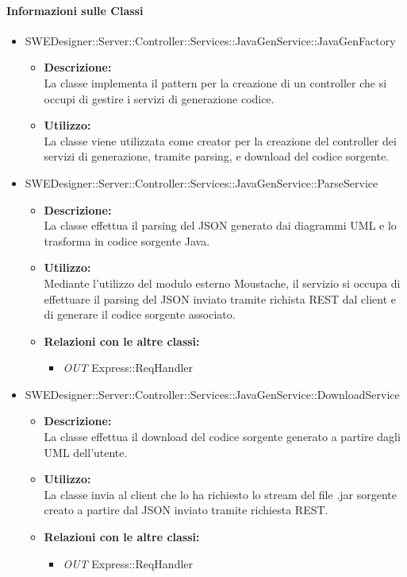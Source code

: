		\paragraph{Informazioni sulle Classi}
		\begin{itemize}
			\item SWEDesigner::Server::Controller::Services::JavaGenService::JavaGenFactory
			\begin{itemize}
				\item \textbf{Descrizione: }\\
				La classe implementa il pattern  per la creazione di un controller che si occupi di gestire i servizi di generazione codice.
				\item \textbf{Utilizzo: }\\
				La classe viene utilizzata come creator per la creazione del controller dei servizi di generazione, tramite parsing, e download del codice sorgente.
			\end{itemize}
			\item SWEDesigner::Server::Controller::Services::JavaGenService::ParseService
			\begin{itemize}
				\item \textbf{Descrizione: }\\
				La classe effettua il parsing del JSON generato dai diagrammi UML e lo trasforma in codice sorgente Java.
				\item \textbf{Utilizzo: }\\
				Mediante l'utilizzo del modulo esterno Moustache, il servizio si occupa di effettuare il parsing del JSON inviato tramite richista REST dal client e di generare
				il codice sorgente associato.
				\item \textbf{Relazioni con le altre classi: }
				\begin{itemize}
					\item \emph{OUT} Express::ReqHandler
				\end{itemize}
			\end{itemize}
			\item SWEDesigner::Server::Controller::Services::JavaGenService::DownloadService
			\begin{itemize}
				\item \textbf{Descrizione: }\\
				La classe effettua il download del codice sorgente generato a partire dagli UML dell'utente.
				\item \textbf{Utilizzo: }\\
				La classe invia al client che lo ha richiesto lo stream del file .jar sorgente creato a partire dal JSON inviato tramite richiesta REST.
				\item \textbf{Relazioni con le altre classi: }
				\begin{itemize}
					\item \emph{OUT} Express::ReqHandler
				\end{itemize}
			\end{itemize}
		\end{itemize}

